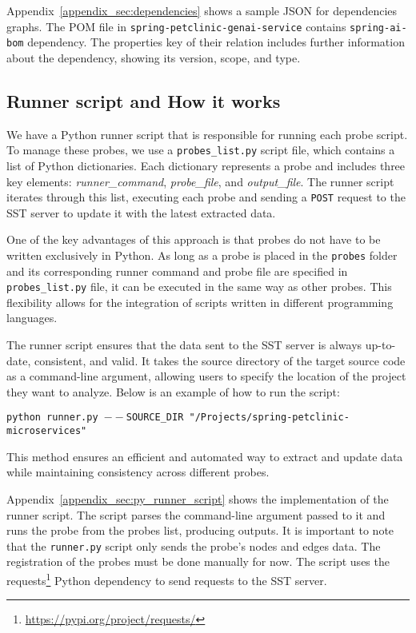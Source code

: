\sloppy
Appendix~\ref{appendix_sec:dependencies} shows a sample JSON for dependencies graphs. The POM file in \texttt{spring-petclinic-genai-service} contains \texttt{spring-ai-bom} dependency. The properties key of their relation includes further information about the dependency, showing its version, scope, and type.

\subsection{Runner script and How it works}

We have a Python runner script that is responsible for running each probe script. To manage these probes, we use a \texttt{probes\_list.py} script file, which contains a list of Python dictionaries. Each dictionary represents a probe and includes three key elements: \textit{runner\_command}, \textit{probe\_file}, and \textit{output\_file}. The runner script iterates through this list, executing each probe and sending a \texttt{POST} request to the SST server to update it with the latest extracted data.  

One of the key advantages of this approach is that probes do not have to be written exclusively in Python. As long as a probe is placed in the \texttt{probes} folder and its corresponding runner command and probe file are specified in \texttt{probes\_list.py} file, it can be executed in the same way as other probes. This flexibility allows for the integration of scripts written in different programming languages.  

The runner script ensures that the data sent to the SST server is always up-to-date, consistent, and valid. It takes the source directory of the target source code as a command-line argument, allowing users to specify the location of the project they want to analyze. Below is an example of how to run the script:

\begin{tcolorbox}[colback=gray!5, colframe=gray!20]
    \texttt{python runner.py \newline ${--}$SOURCE\_DIR "/Projects/spring-petclinic-microservices"}
\end{tcolorbox}

This method ensures an efficient and automated way to extract and update data while maintaining consistency across different probes.

Appendix~\ref{appendix_sec:py_runner_script} shows the implementation of the runner script. The script parses the command-line argument passed to it and runs the probe from the probes list, producing outputs. It is important to note that the \texttt{runner.py} script only sends the probe's nodes and edges data. The registration of the probes must be done manually for now. The script uses the requests\footnote{\url{https://pypi.org/project/requests/}} Python dependency to send requests to the SST server.